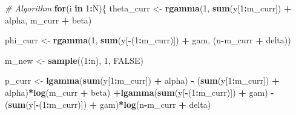 \documentclass[]{article}
\newenvironment{Shaded}{\begin{snugshade}}{\end{snugshade}}
\newcommand{\KeywordTok}[1]{\textcolor[rgb]{0.13,0.29,0.53}{\textbf{#1}}}
\newcommand{\DecValTok}[1]{\textcolor[rgb]{0.00,0.00,0.81}{#1}}
\newcommand{\StringTok}[1]{\textcolor[rgb]{0.31,0.60,0.02}{#1}}
\newcommand{\CommentTok}[1]{\textcolor[rgb]{0.56,0.35,0.01}{\textit{#1}}}
\newcommand{\OtherTok}[1]{\textcolor[rgb]{0.56,0.35,0.01}{#1}}
\newcommand{\ControlFlowTok}[1]{\textcolor[rgb]{0.13,0.29,0.53}{\textbf{#1}}}
\newcommand{\OperatorTok}[1]{\textcolor[rgb]{0.81,0.36,0.00}{\textbf{#1}}}
\newcommand{\NormalTok}[1]{#1}
\begin{document}
\begin{Shaded}
\begin{Highlighting}[]
\CommentTok{# Algorithm}
\ControlFlowTok{for}\NormalTok{(i }\ControlFlowTok{in} \DecValTok{1}\OperatorTok{:}\NormalTok{N)\{}
\NormalTok{  theta_curr <-}\StringTok{ }\KeywordTok{rgamma}\NormalTok{(}\DecValTok{1}\NormalTok{, }\KeywordTok{sum}\NormalTok{(y[}\DecValTok{1}\OperatorTok{:}\NormalTok{m_curr]) }\OperatorTok{+}\StringTok{ }\NormalTok{alpha, m_curr }\OperatorTok{+}\StringTok{ }\NormalTok{beta)}
  
\NormalTok{  phi_curr <-}\StringTok{ }\KeywordTok{rgamma}\NormalTok{(}\DecValTok{1}\NormalTok{, }\KeywordTok{sum}\NormalTok{(y[}\OperatorTok{-}\NormalTok{(}\DecValTok{1}\OperatorTok{:}\NormalTok{m_curr)]) }\OperatorTok{+}\StringTok{ }\NormalTok{gam, (n}\OperatorTok{-}\NormalTok{m_curr }\OperatorTok{+}\StringTok{ }\NormalTok{delta))}
  
\NormalTok{  m_new <-}\StringTok{ }\KeywordTok{sample}\NormalTok{((}\DecValTok{1}\OperatorTok{:}\NormalTok{n), }\DecValTok{1}\NormalTok{, }\OtherTok{FALSE}\NormalTok{)}
  
\NormalTok{  p_curr <-}\StringTok{ }\KeywordTok{lgamma}\NormalTok{(}\KeywordTok{sum}\NormalTok{(y[}\DecValTok{1}\OperatorTok{:}\NormalTok{m_curr]) }\OperatorTok{+}\StringTok{ }\NormalTok{alpha) }\OperatorTok{-}\StringTok{ }\NormalTok{(}\KeywordTok{sum}\NormalTok{(y[}\DecValTok{1}\OperatorTok{:}\NormalTok{m_curr]) }\OperatorTok{+}\StringTok{ }\NormalTok{alpha)}\OperatorTok{*}\KeywordTok{log}\NormalTok{(m_curr }\OperatorTok{+}\StringTok{ }\NormalTok{beta) }\OperatorTok{+}\KeywordTok{lgamma}\NormalTok{(}\KeywordTok{sum}\NormalTok{(y[}\OperatorTok{-}\NormalTok{(}\DecValTok{1}\OperatorTok{:}\NormalTok{m_curr)]) }\OperatorTok{+}\StringTok{ }\NormalTok{gam) }\OperatorTok{-}\StringTok{ }\NormalTok{(}\KeywordTok{sum}\NormalTok{(y[}\OperatorTok{-}\NormalTok{(}\DecValTok{1}\OperatorTok{:}\NormalTok{m_curr)]) }\OperatorTok{+}\StringTok{ }\NormalTok{gam)}\OperatorTok{*}\KeywordTok{log}\NormalTok{(n}\OperatorTok{-}\NormalTok{m_curr }\OperatorTok{+}\StringTok{ }\NormalTok{delta)}
  

\end{Highlighting}
\end{Shaded}
\end{document}
